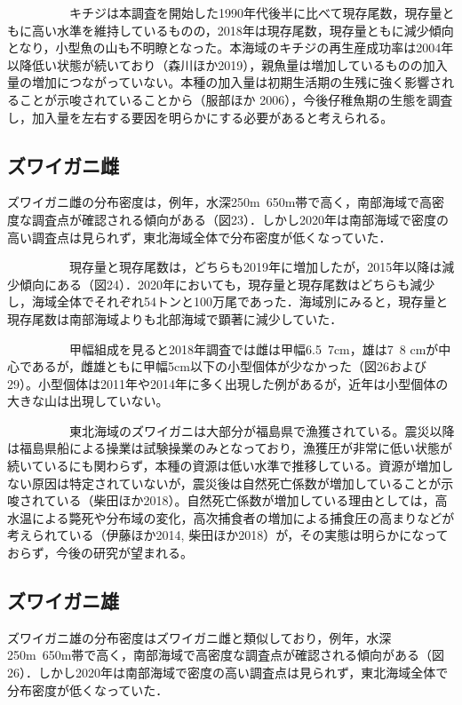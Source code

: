 \documentclass[11pt]{article} %
\begin{document}
\begin{linenumbers}
\ \ \ \ \ \ \ \ \ \ 
キチジは本調査を開始した1990年代後半に比べて現存尾数，現存量ともに高い水準を維持しているものの，2018年は現存尾数，現存量ともに減少傾向となり，小型魚の山も不明瞭となった。本海域のキチジの再生産成功率は2004年以降低い状態が続いており（森川ほか2019），親魚量は増加しているものの加入量の増加につながっていない。本種の加入量は初期生活期の生残に強く影響されることが示唆されていることから（服部ほか 2006），今後仔稚魚期の生態を調査し，加入量を左右する要因を明らかにする必要があると考えられる。

\subsection{ズワイガニ雌}
ズワイガニ雌の分布密度は，例年，水深250m~650m帯で高く，南部海域で高密度な調査点が確認される傾向がある（図23）．しかし2020年は南部海域で密度の高い調査点は見られず，東北海域全体で分布密度が低くなっていた．

\ \ \ \ \ \ \ \ \ \ 
現存量と現存尾数は，どちらも2019年に増加したが，2015年以降は減少傾向にある（図24）．2020年においても，現存量と現存尾数はどちらも減少し，海域全体でそれぞれ54トンと100万尾であった．海域別にみると，現存量と現存尾数は南部海域よりも北部海域で顕著に減少していた．

\ \ \ \ \ \ \ \ \ \ 
甲幅組成を見ると2018年調査では雌は甲幅6.5~7cm，雄は7~8 cmが中心であるが，雌雄ともに甲幅5cm以下の小型個体が少なかった（図26および29）。小型個体は2011年や2014年に多く出現した例があるが，近年は小型個体の大きな山は出現していない。

\ \ \ \ \ \ \ \ \ \ 
東北海域のズワイガニは大部分が福島県で漁獲されている。震災以降は福島県船による操業は試験操業のみとなっており，漁獲圧が非常に低い状態が続いているにも関わらず，本種の資源は低い水準で推移している。資源が増加しない原因は特定されていないが，震災後は自然死亡係数が増加していることが示唆されている（柴田ほか2018）。自然死亡係数が増加している理由としては，高水温による斃死や分布域の変化，高次捕食者の増加による捕食圧の高まりなどが考えられている（伊藤ほか2014, 柴田ほか2018）が，その実態は明らかになっておらず，今後の研究が望まれる。

\subsection{ズワイガニ雄}
ズワイガニ雄の分布密度はズワイガニ雌と類似しており，例年，水深250m~650m帯で高く，南部海域で高密度な調査点が確認される傾向がある（図26）．しかし2020年は南部海域で密度の高い調査点は見られず，東北海域全体で分布密度が低くなっていた．


\end{linenumbers}
\end{document}
